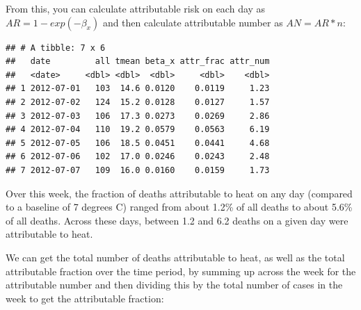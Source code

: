 \documentclass[
]{book}
\newenvironment{Shaded}{\begin{snugshade}}{\end{snugshade}}
\newcommand{\DataTypeTok}[1]{\textcolor[rgb]{0.13,0.29,0.53}{#1}}
\newcommand{\DecValTok}[1]{\textcolor[rgb]{0.00,0.00,0.81}{#1}}
\newcommand{\KeywordTok}[1]{\textcolor[rgb]{0.13,0.29,0.53}{\textbf{#1}}}
\newcommand{\NormalTok}[1]{#1}
\newcommand{\OperatorTok}[1]{\textcolor[rgb]{0.81,0.36,0.00}{\textbf{#1}}}
\newcommand{\StringTok}[1]{\textcolor[rgb]{0.31,0.60,0.02}{#1}}
\begin{document}
From this, you can calculate attributable risk on each day as \(AR = 1 - exp(-\beta_x)\) and then calculate attributable number as \(AN = AR * n\):

\begin{Shaded}
\end{Shaded}

\begin{verbatim}
## # A tibble: 7 x 6
##   date         all tmean beta_x attr_frac attr_num
##   <date>     <dbl> <dbl>  <dbl>     <dbl>    <dbl>
## 1 2012-07-01   103  14.6 0.0120    0.0119     1.23
## 2 2012-07-02   124  15.2 0.0128    0.0127     1.57
## 3 2012-07-03   106  17.3 0.0273    0.0269     2.86
## 4 2012-07-04   110  19.2 0.0579    0.0563     6.19
## 5 2012-07-05   106  18.5 0.0451    0.0441     4.68
## 6 2012-07-06   102  17.0 0.0246    0.0243     2.48
## 7 2012-07-07   109  16.0 0.0160    0.0159     1.73
\end{verbatim}

Over this week, the fraction of deaths attributable to heat on any day (compared to a baseline of 7 degrees C) ranged from about 1.2\% of all deaths to about 5.6\% of all deaths. Across these days, between 1.2 and 6.2 deaths on a given day were attributable to heat.

We can get the total number of deaths attributable to heat, as well as the total attributable fraction over the time period, by summing up across the week for the attributable number and then dividing this by the total number of cases in the week to get the attributable fraction:

\begin{Shaded}
\end{Shaded}
\end{document}
